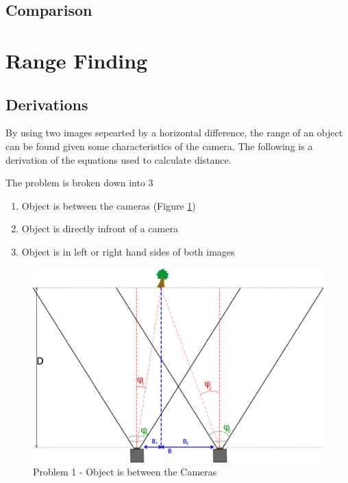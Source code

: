 \subsection{Comparison}



\section{Range Finding}

\subsection{Derivations}

By using two images sepearted by a horizontal difference, the range of an object can be found given some characteristics of the camera. The following is a derivation of the equations used to calculate distance. 

The problem is broken down into 3
\begin{enumerate}
\item Object is between the cameras (Figure \ref{problem_between})
\item Object is directly infront of a camera
\item Object is in left or right hand sides of both images
\end{enumerate}

\begin{figure}
\includegraphics[width=\textwidth,height=\textheight,keepaspectratio]{Figures/problem1.png}
\caption{Problem 1 - Object is between the Cameras}
\label{problem_between}
\end{figure}

